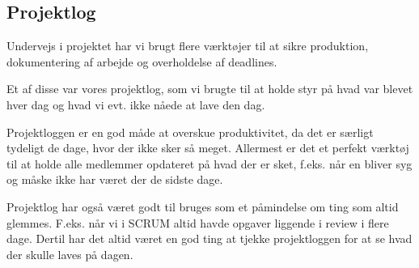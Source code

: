 \subsection{Projektlog}

Undervejs i projektet har vi brugt flere værktøjer til at sikre produktion, dokumentering af arbejde og overholdelse af deadlines.

Et af disse var vores projektlog, som vi brugte til at holde styr på hvad var blevet hver dag og hvad vi evt. ikke nåede at lave den dag.

Projektloggen er en god måde at overskue produktivitet, da det er særligt tydeligt de dage, hvor der ikke sker så meget. Allermest er det et perfekt værktøj til at holde alle medlemmer opdateret på hvad der er sket, f.eks. når en bliver syg og måske ikke har været der de sidste dage.

Projektlog har også været godt til bruges som et påmindelse om ting som altid glemmes. F.eks. når vi i SCRUM altid havde opgaver liggende i review i flere dage. Dertil har det altid været en god ting at tjekke projektloggen for at se hvad der skulle laves på dagen.
